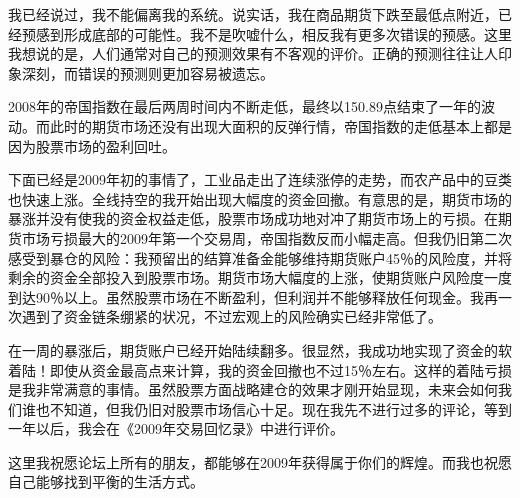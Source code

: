 我已经说过，我不能偏离我的系统。说实话，我在商品期货下跌至最低点附近，已经预感到形成底部的可能性。我不是吹嘘什么，相反我有更多次错误的预感。这里我想说的是，人们通常对自己的预测效果有不客观的评价。正确的预测往往让人印象深刻，而错误的预测则更加容易被遗忘。

2008年的帝国指数在最后两周时间内不断走低，最终以150.89点结束了一年的波动。而此时的期货市场还没有出现大面积的反弹行情，帝国指数的走低基本上都是因为股票市场的盈利回吐。

下面已经是2009年初的事情了，工业品走出了连续涨停的走势，而农产品中的豆类也快速上涨。全线持空的我开始出现大幅度的资金回撤。有意思的是，期货市场的暴涨并没有使我的资金权益走低，股票市场成功地对冲了期货市场上的亏损。在期货市场亏损最大的2009年第一个交易周，帝国指数反而小幅走高。但我仍旧第二次感受到暴仓的风险：我预留出的结算准备金能够维持期货账户45％的风险度，并将剩余的资金全部投入到股票市场。期货市场大幅度的上涨，使期货账户风险度一度到达90％以上。虽然股票市场在不断盈利，但利润并不能够释放任何现金。我再一次遇到了资金链条绷紧的状况，不过宏观上的风险确实已经非常低了。

在一周的暴涨后，期货账户已经开始陆续翻多。很显然，我成功地实现了资金的软着陆！即使从资金最高点来计算，我的资金回撤也不过15％左右。这样的着陆亏损是我非常满意的事情。虽然股票方面战略建仓的效果才刚开始显现，未来会如何我们谁也不知道，但我仍旧对股票市场信心十足。现在我先不进行过多的评论，等到一年以后，我会在《2009年交易回忆录》中进行评价。

这里我祝愿论坛上所有的朋友，都能够在2009年获得属于你们的辉煌。而我也祝愿自己能够找到平衡的生活方式。

\clearpage
